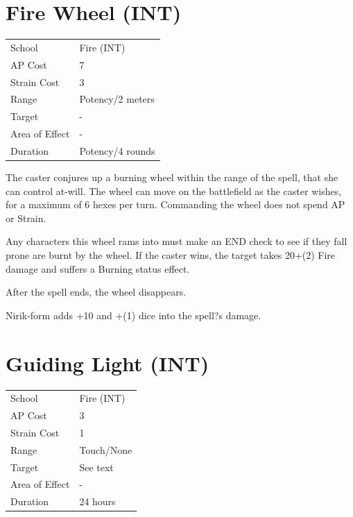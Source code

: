 \documentclass[11pt,a4paper,twocolumn]{book}
\begin{document}
		\section*{Fire Wheel (INT)}
	{
		\begin{tabu} to 75mm{| X[l,4] | X[l,7] |}
			\hline
			School 			&  Fire (INT)			\\
			AP Cost	      	&  7					\\
			Strain Cost     &  3					\\
			Range     		&  Potency/2 meters		\\
			Target      	&  -					\\
			Area of Effect  &  -	 				\\
			Duration     	&  Potency/4 rounds		\\ \hline
		\end{tabu}
		
	}
	
	\medskip
	
	The caster conjures up a burning wheel within the range of the spell, that she can control at-will. The wheel can move on the battlefield as the caster wishes, for a maximum of 6 hexes per turn. Commanding the wheel does not spend AP or Strain. 
	
	Any characters this wheel rams into must make an END check to see if they fall prone are burnt by the wheel. If the caster wins, the target takes 20+(2) Fire damage and suffers a Burning status effect.
	
	After the spell ends, the wheel disappears.
	
	Nirik-form adds +10 and +(1) dice into the spell?s damage.
	
		\section*{Guiding Light (INT)}
	{
		\begin{tabu} to 75mm{| X[l,4] | X[l,7] |}
			\hline
			School 			&  Fire (INT)			\\
			AP Cost	      	&  3					\\
			Strain Cost     &  1					\\
			Range     		&  Touch/None			\\
			Target      	&  See text				\\
			Area of Effect  &  -	 				\\
			Duration     	&  24 hours				\\ \hline
		\end{tabu}
		
	}
	
\end{document}
